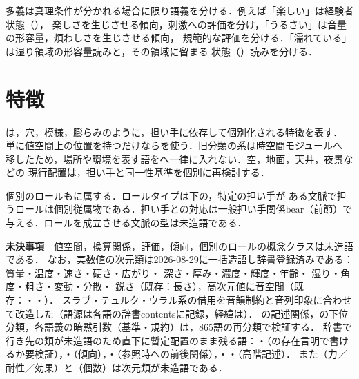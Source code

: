 \documentclass[../../main-detail.tex]{subfiles}
\begin{document}
多義は真理条件が分かれる場合に限り語義を分ける．例えば「楽しい」は経験者状態（），
楽しさを生じさせる傾向，刺激への評価を分け，「うるさい」は音量の形容量，煩わしさを生じさせる傾向，
規範的な評価を分ける．「濡れている」は湿り領域の形容量読みと，その領域に留まる
状態（）読みを分ける．

\section{特徴}

は，穴，模様，膨らみのように，担い手に依存して個別化される特徴を表す．
単に値空間上の位置を持つだけならを使う．旧分類の系は時空間モジュールへ
移したため，場所や環境を表す語をへ一律に入れない．空，地面，天井，夜景などの
現行配置は，担い手と同一性基準を個別に再検討する．

個別のロールもに属する．ロールタイプは下の，特定の担い手が
ある文脈で担うロールは個別従属物である．担い手との対応は一般担い手関係$\mathrm{bear}$（前節）で与える．ロールを成立させる文脈の型は未造語である．

\begin{devbox}
\textbf{未決事項}　値空間，換算関係，評価，傾向，個別のロールの概念クラスは未造語である．
なお，実数値の次元類は2026-08-29に一括造語し辞書登録済みである：
質量・温度・速さ・硬さ・広がり・
深さ・厚み・濃度・輝度・年齢・
湿り・角度・粗さ・変動・分散・
鋭さ（既存：長さ），高次元値に音空間（既存：・・）．
スラブ・テュルク・ウラル系の借用を音韻制約と音列印象に合わせて改造した（語源は各語の辞書contentsに記録，経緯は）．
の記述関係，の下位分類，各語義の暗黙引数（基準・規約）は，865語の再分類で検証する．
辞書で行き先の類が未造語のため直下に暫定配置のまま残る語：・（の存在言明で書けるか要検証），・（傾向），・（参照時への前後関係），・・（高階記述）．
また（力／耐性／効果）と（個数）は次元類が未造語である．
\end{devbox}
\end{document}
